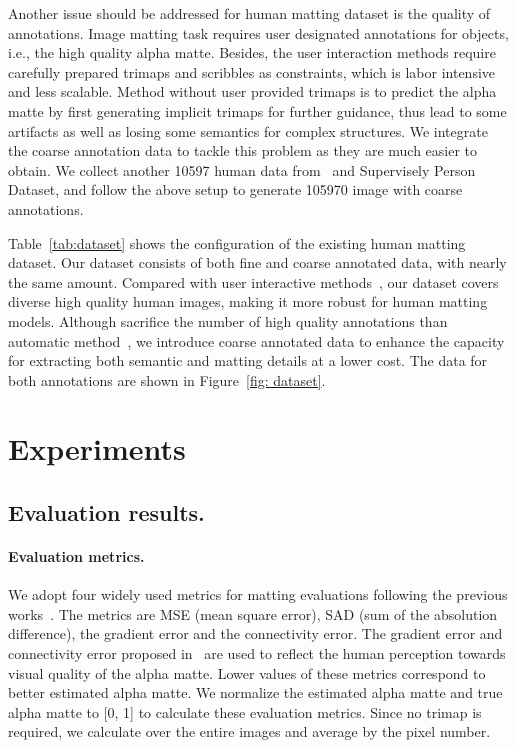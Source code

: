 \documentclass[10pt,twocolumn,letterpaper]{article}
\begin{document}
Another issue should be addressed for human matting dataset is the quality of annotations. Image matting task requires user designated annotations for objects, i.e., the high quality alpha matte. Besides, the user interaction methods require carefully prepared trimaps and scribbles as constraints, which is labor intensive and less scalable. Method without user provided trimaps is to predict the alpha matte by first generating implicit trimaps for further guidance, thus lead to some artifacts as well as losing some semantics for complex structures. We integrate the coarse annotation data to tackle this problem as they are much easier to obtain. We collect another 10597 human data from~\cite{wu2014early} and Supervisely Person Dataset, and follow the above setup to generate 105970 image with coarse annotations.

Table~\ref{tab:dataset} shows the configuration of the existing human matting dataset. Our dataset consists of both fine and coarse annotated data, with nearly the same amount. Compared with user interactive methods~\cite{shen2016deep,xu2017deep}, our dataset covers diverse high quality human images, making it more robust for human matting models. Although sacrifice the number of high quality annotations than automatic method~\cite{chen2018semantic}, we introduce coarse annotated data to enhance the capacity for extracting both semantic and matting details at a lower cost. The data for both annotations are shown in Figure~\ref{fig: dataset}.

\section{Experiments}
\label{sec: Experiments}


\subsection{Evaluation results.}

\paragraph{Evaluation metrics.} We adopt four widely used metrics for matting evaluations following the previous works~\cite{xu2017deep,chen2018semantic}. The metrics are MSE (mean square error), SAD (sum of the absolution difference), the gradient error and the connectivity error. The gradient error and connectivity error proposed in~\cite{rhemann2009perceptually} are used to reflect the human perception towards visual quality of the alpha matte. Lower values of these metrics correspond to better estimated alpha matte.  We normalize the estimated alpha matte and true alpha matte to [0, 1] to calculate these evaluation metrics. Since no trimap is required, we calculate over the entire images and average by the pixel number.
\end{document}
